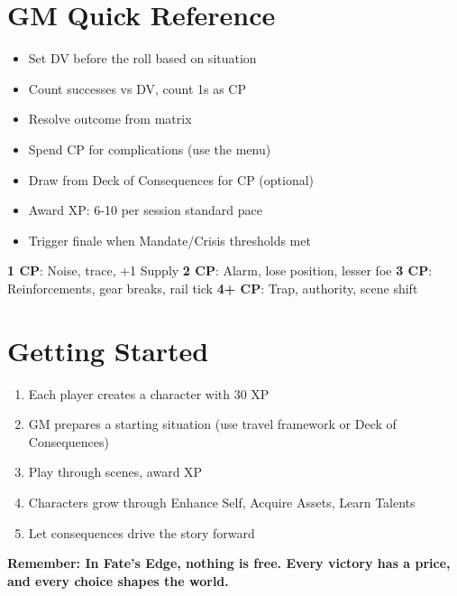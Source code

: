 \documentclass[11pt]{article}
\begin{document}
\section{GM Quick Reference}

\begin{itemize}
    \item Set DV before the roll based on situation
    \item Count successes vs DV, count 1s as CP
    \item Resolve outcome from matrix
    \item Spend CP for complications (use the menu)
    \item Draw from Deck of Consequences for CP (optional)
    \item Award XP: 6-10 per session standard pace
    \item Trigger finale when Mandate/Crisis thresholds met
\end{itemize}

\begin{fatebox}
\textbf{1 CP}: Noise, trace, +1 Supply
\textbf{2 CP}: Alarm, lose position, lesser foe
\textbf{3 CP}: Reinforcements, gear breaks, rail tick  
\textbf{4+ CP}: Trap, authority, scene shift
\end{fatebox}

\section{Getting Started}

\begin{enumerate}
    \item Each player creates a character with 30 XP
    \item GM prepares a starting situation (use travel framework or Deck of Consequences)
    \item Play through scenes, award XP
    \item Characters grow through Enhance Self, Acquire Assets, Learn Talents
    \item Let consequences drive the story forward
\end{enumerate}

\begin{center}
\textbf{Remember: In Fate's Edge, nothing is free. Every victory has a price, and every choice shapes the world.}
\end{center}
\end{document}

